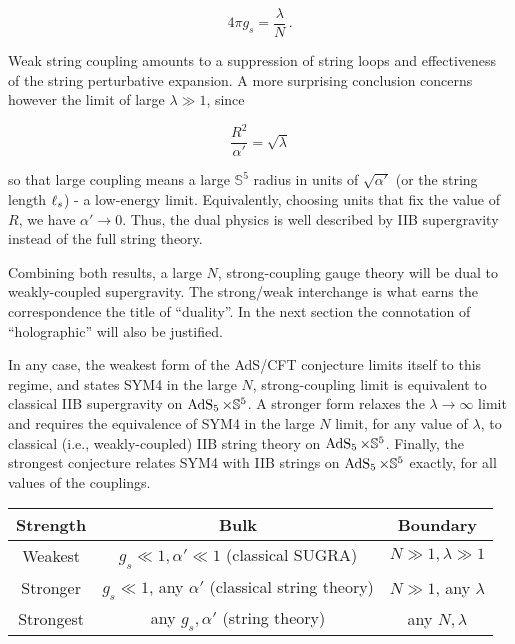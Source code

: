 \begin{equation}
	4\pi g_s = \frac{\lambda}{N}\,.
	\label{}
\end{equation}

Weak string coupling amounts to a suppression of string loops and effectiveness of the string perturbative expansion. A more surprising conclusion concerns however the limit of large $\lambda \gg 1$, since

\begin{equation}
	\frac{R^2}{\alpha'} = \sqrt \lambda
	\label{}
\end{equation}

so that large coupling means a large $\mathbb{S}^5$ radius in units of $\sqrt{\alpha'}$ (or the string length $\ell_s$) - a low-energy limit. Equivalently, choosing units that fix the value of $R$, we have $\alpha' \rightarrow 0$. Thus, the dual physics is well described by IIB supergravity instead of the full string theory.

Combining both results, a large $N$, strong-coupling gauge theory will be dual to weakly-coupled supergravity. The strong/weak interchange is what earns the correspondence the title of ``duality''. In the next section the connotation of ``holographic'' will also be justified.

In any case, the weakest form of the AdS/CFT conjecture limits itself to this regime, and states SYM4 in the large $N$, strong-coupling limit is equivalent to classical IIB supergravity on $\operatorname{AdS}_{5} \times \mathbb{S}^5$. A stronger form relaxes the $\lambda \rightarrow \infty$ limit and requires the equivalence of SYM4 in the large $N$ limit, for any value of $\lambda$, to classical (i.e., weakly-coupled) IIB string theory on $\operatorname{AdS}_{5} \times \mathbb{S}^5$. Finally, the strongest conjecture relates SYM4 with IIB strings on $\operatorname{AdS}_{5}\times\mathbb{S}^5$ exactly, for all values of the couplings.

\begin{center}
	\begin{tabular}{c||c|c}
		Strength	& Bulk & Boundary\\ \midrule\midrule
		Weakest & $g_s \ll 1, \alpha' \ll 1$ (classical SUGRA) 	& $N\gg 1,\lambda \gg 1$	\\
		Stronger& $g_s \ll 1$, any $\alpha'$ (classical string theory)	&  $N\gg 1$, any $\lambda$	\\
		Strongest& any $g_s,\alpha'$ (string theory)	&  any $N,\lambda$\\
	\end{tabular}
\end{center}




